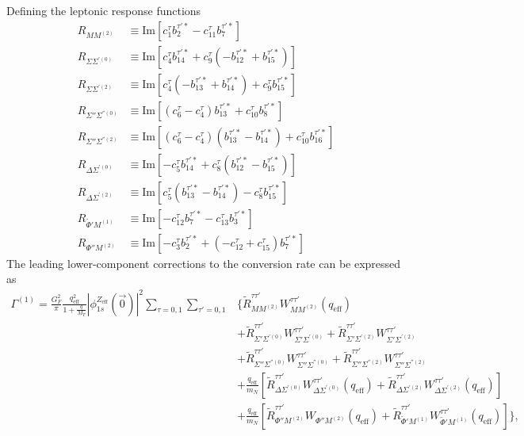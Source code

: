 \documentclass{book}[letterpaper,12pt]
\begin{document}
Defining the leptonic response functions
\begin{equation}
\begin{split}
R_{MM^{(2)}}&\equiv \mathrm{Im}\left[c_1^{\tau}b_2^{\tau'*}-c_{11}^{\tau}b_7^{\tau'*}\right]\\
R_{\Sigma\Sigma^{'(0)}}&\equiv \mathrm{Im}\left[c_4^{\tau}b_{14}^{\tau'*}+c_9^{\tau}(-b_{12}^{\tau'*}+b_{15}^{\tau'*})\right]\\
R_{\Sigma\Sigma^{'(2)}}&\equiv \mathrm{Im}\left[c_4^{\tau}(-b_{13}^{\tau'*}+b_{14}^{\tau'*})+c_9^{\tau}b_{15}^{\tau'*}\right]\\
R_{\Sigma''\Sigma^{''(0)}}&\equiv \mathrm{Im}\left[(c_6^{\tau}-c_4^{\tau})b_{13}^{\tau'*}+c_{10}^{\tau}b_8^{\tau'*}\right]\\
R_{\Sigma''\Sigma^{''(2)}}&\equiv\mathrm{Im}\left[(c_6^{\tau}-c_4^{\tau})(b_{13}^{\tau'*}-b_{14}^{\tau'*})+c_{10}^{\tau}b_{16}^{\tau'*}\right]\\
R_{\Delta\Sigma^{'(0)}}&\equiv \mathrm{Im}\left[-c_5^{\tau}b_{14}^{\tau'*}+c_8^{\tau}(b_{12}^{\tau'*}-b_{15}^{\tau'*})\right]\\
R_{\Delta\Sigma^{'(2)}}&\equiv \mathrm{Im}\left[c_5^{\tau}(b_{13}^{\tau'*}-b_{14}^{\tau'*})-c_8^{\tau}b_{15}^{\tau'*}\right]\\
R_{\tilde{\Phi}'M^{(1)}}&\equiv \mathrm{Im}\left[-c_{12}^{\tau}b_7^{\tau'*}-c_{13}^{\tau}b_3^{\tau'*}\right]\\
R_{\Phi''M^{(2)}}&\equiv \mathrm{Im}\left[-c_3^{\tau}b_2^{\tau'*}+(-c_{12}^{\tau}+c_{15}^{\tau})b_7^{\tau'*}\right]
\end{split}
\end{equation}
The leading lower-component corrections to the conversion rate can be expressed as
\begin{equation}
\begin{split}
\Gamma^{(1)}=\frac{G_F^2}{\pi}\frac{q_\mathrm{eff}^2}{1+\frac{q}{M_T}}|\phi_{1s}^{Z_\mathrm{eff}}(\vec{0})|^2\sum_{\tau=0,1}\sum_{\tau'=0,1}&\Bigg\{\tilde{R}_{MM^{(2)}}^{\tau\tau'}W_{MM^{(2)}}^{\tau\tau'}(q_\mathrm{eff})\\
&+\tilde{R}_{\Sigma'\Sigma^{'(0)}}^{\tau\tau'}W_{\Sigma'\Sigma^{'(0)}}^{\tau\tau'}+\tilde{R}_{\Sigma'\Sigma^{'(2)}}^{\tau\tau'}W_{\Sigma'\Sigma^{'(2)}}^{\tau\tau'}\\
&+\tilde{R}_{\Sigma''\Sigma^{''(0)}}^{\tau\tau'}W_{\Sigma''\Sigma^{''(0)}}^{\tau\tau'}+\tilde{R}_{\Sigma''\Sigma^{''(2)}}^{\tau\tau'}W_{\Sigma''\Sigma^{''(2)}}^{\tau\tau'}\\
&+\frac{q_\mathrm{eff}}{m_N}\left[\tilde{R}_{\Delta\Sigma^{'(0)}}^{\tau\tau'}W_{\Delta\Sigma^{'(0)}}^{\tau\tau'}(q_\mathrm{eff})+\tilde{R}_{\Delta\Sigma^{'(2)}}^{\tau\tau'}W_{\Delta\Sigma^{'(2)}}^{\tau\tau'}(q_\mathrm{eff})\right]\\
&+\frac{q_\mathrm{eff}}{m_N}\left[\tilde{R}_{\Phi''M^{(2)}}^{\tau\tau'}W_{\Phi''M^{(2)}}(q_\mathrm{eff})+\tilde{R}_{\tilde{\Phi}'M^{(1)}}^{\tau\tau'}W_{\tilde{\Phi}'M^{(1)}}^{\tau\tau'}(q_\mathrm{eff})\right]\Bigg\},
\end{split}
\end{equation}
\end{document}
